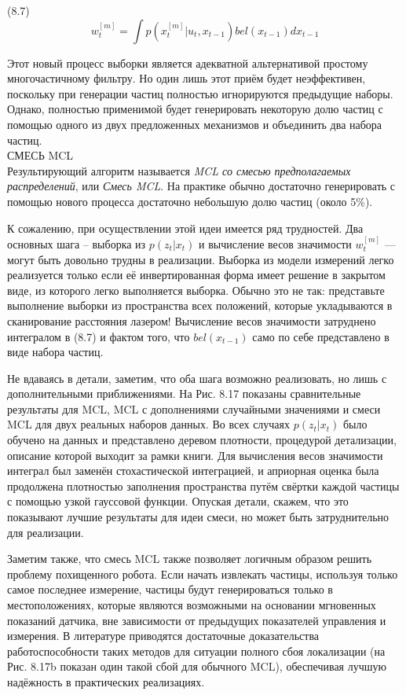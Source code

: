 \documentclass[10pt,a4paper]{article}
\begin{document}
(8.7)
$$w_t^{[m]}=\int p(x_t^{[m]}|u_t,x_{t-1})bel(x_{t-1})dx_{t-1}$$

Этот новый процесс выборки является адекватной альтернативой простому многочастичному фильтру. Но один лишь этот приём будет неэффективен, поскольку при генерации частиц полностью игнорируются предыдущие наборы. Однако, полностью применимой будет генерировать некоторую долю частиц с помощью одного из двух предложенных механизмов и объединить два набора частиц.\\
СМЕСЬ MCL\\
Результирующий алгоритм называется  \textit{MCL со смесью предполагаемых распределений}, или \textit{Смесь MCL}. На практике обычно достаточно генерировать с помощью нового процесса достаточно небольшую долю частиц (около 5\%).

К сожалению, при осуществлении этой идеи имеется ряд трудностей. Два основных шага – выборка из $p(z_t | x_t)$ и вычисление весов значимости $w_t^{[m]}$ — могут быть довольно трудны в реализации. Выборка из модели измерений легко реализуется только если её инвертированная форма имеет решение в закрытом виде, из которого легко выполняется выборка. Обычно это не так: представьте выполнение выборки из пространства всех положений, которые укладываются в сканирование расстояния лазером! Вычисление весов значимости затруднено интегралом в (8.7) и фактом того, что $bel(x_{t-1})$ само по себе представлено в виде набора частиц.

Не вдаваясь в детали, заметим, что оба шага возможно реализовать, но лишь с дополнительными приближениями. На Рис. 8.17 показаны сравнительные результаты для MCL, MCL с дополнениями случайными значениями и смеси MCL для двух реальных наборов данных. Во всех случаях $p(z_t | x_t)$ было обучено на данных и представлено деревом плотности, процедурой детализации, описание которой выходит за рамки книги. Для вычисления весов значимости интеграл был заменён стохастической интеграцией, и априорная оценка была продолжена плотностью заполнения пространства путём свёртки каждой частицы с помощью узкой гауссовой функции. Опуская детали, скажем, что это показывают лучшие результаты для идеи смеси, но может быть затруднительно для реализации.

Заметим также, что смесь MCL также позволяет логичным образом решить проблему похищенного робота. Если начать извлекать частицы, используя только самое последнее измерение, частицы будут генерироваться только в местоположениях, которые являются возможными на основании мгновенных показаний датчика, вне зависимости от предыдущих показателей управления и измерения. В литературе приводятся достаточные доказательства работоспособности таких методов для ситуации полного сбоя локализации (на Рис. 8.17b показан один такой сбой для обычного MCL), обеспечивая лучшую надёжность в практических реализациях.\\
\end{document}
